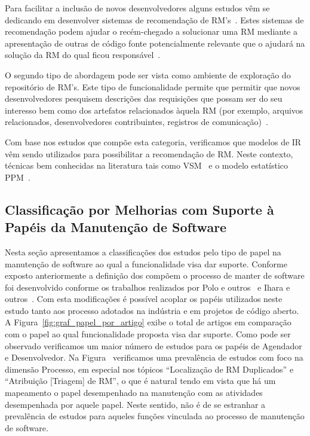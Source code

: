 Para facilitar a inclusão de novos desenvolvedores alguns estudos vêm se
dedicando em desenvolver sistemas de recomendação de
RM's~\cite{malheiros2012source, Wang2011bug}. Estes sistemas de recomendação
podem ajudar o recém-chegado a solucionar uma RM mediante a apresentação de
outras de código fonte potencialmente relevante que o ajudará na solução da RM
do qual ficou responsável~\cite{malheiros2012source}.

O segundo tipo de abordagem pode ser vista como ambiente de exploração do
repositório de RM's.  Este tipo de funcionalidade permite que permitir que novos
desenvolvedores pesquisem descrições das requisições que possam ser do seu
interesso bem como dos artefatos relacionados àquela RM (por exemplo, arquivos
relacionados, desenvolvedores contribuintes, registros de
comunicação)~\cite{Wang2011bug}.

Com base nos estudos que compõe esta categoria, verificamos que modelos de IR
vêm sendo utilizados para possibilitar a recomendação de RM\@. Neste contexto,
técnicas bem conhecidas na literatura tais como VSM~\cite{Wang2011bug} e o
modelo estatístico PPM~\cite{malheiros2012source}.

\subsection{Classificação por Melhorias com Suporte à Papéis da Manutenção de
	Software}
\label{sub:extensões_com_suporte_a_papeis}
Nesta seção apresentamos a
classificações dos estudos pelo tipo de papel na manutenção de software ao qual
a funcionalidade visa dar suporte. Conforme exposto anteriormente a definição
dos compõem o processo de manter de software foi desenvolvido conforme os
trabalhos realizados por Polo e outros~\cite{Polo1999} e Ihara e
outros~\cite{Ihara:2009:AMI:1595808.1595833}\@.  Com esta modificações é
possível acoplar os papéis utilizados neste estudo tanto aos processo adotados
na indústria e em projetos de código aberto. A
Figura~\ref{fig:graf_papel_por_artigo} exibe o total de artigos em comparação
com o papel ao qual funcionalidade proposta visa dar suporte. Como pode ser
observado verificamos um maior número de estudos para os papéis de Agendador e
Desenvolvedor. Na Figura~\cite{fig:grafico_topico_por_artigo} verificamos uma
prevalência de estudos com foco na dimensão Processo, em especial nos tópicos
``Localização de RM Duplicados'' e ``Atribuição [Triagem] de RM'', o que  é
natural tendo em vista que há um mapeamento o papel desempenhado na manutenção
com as atividades desempenhada por aquele papel. Neste sentido, não é de se
estranhar a prevalência de estudos para aqueles funções vinculada ao processo de
manutenção de software.

